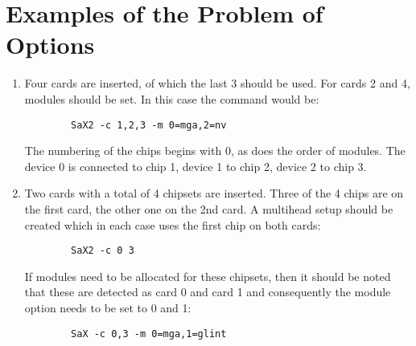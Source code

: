 \chapter{Examples of the Problem of Options}
\minitoc

\begin{enumerate}
\item Four cards are inserted, of which the last 3 should be used. For cards 2
  and 4, modules should be set. In this case the command would be:
      \begin{verbatim}
        SaX2 -c 1,2,3 -m 0=mga,2=nv
      \end{verbatim}
      The numbering of the chips begins with 0, as does the order of
      modules. The device 0 is connected to chip 1, device 1 to chip 2, device
      2 to chip 3. 

\item Two cards with a total of 4 chipsets are inserted.
      Three of the 4 chips are on the first card, the other one on the 2nd
      card. A multihead setup should be created which in each case uses the
      first chip on both cards:
      \begin{verbatim}
        SaX2 -c 0 3 
      \end{verbatim}
      If modules need to be allocated for these chipsets, then it should be
      noted that these are detected as card 0 and card 1 and consequently the
      module option needs to be set to 0 and 1: 
      \begin{verbatim}
        SaX -c 0,3 -m 0=mga,1=glint
      \end{verbatim}
\end{enumerate}
